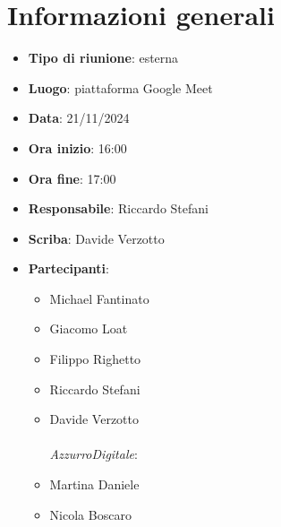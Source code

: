 


\section{Informazioni generali}

\begin{itemize}
    \item \textbf{Tipo di riunione}: esterna
    \item \textbf{Luogo}: piattaforma Google Meet
    \item \textbf{Data}: 21/11/2024
    \item \textbf{Ora inizio}: 16:00
    \item \textbf{Ora fine}: 17:00
    \item \textbf{Responsabile}: Riccardo Stefani
    \item \textbf{Scriba}: Davide Verzotto
    \item \textbf{Partecipanti}:
    \begin{itemize}
        \item Michael Fantinato
        \item Giacomo Loat
        \item Filippo Righetto
        \item Riccardo Stefani
        \item Davide Verzotto \\ \\
        \emph{AzzurroDigitale}:
        \item Martina Daniele
        \item Nicola Boscaro
    \end{itemize}
\end{itemize}
